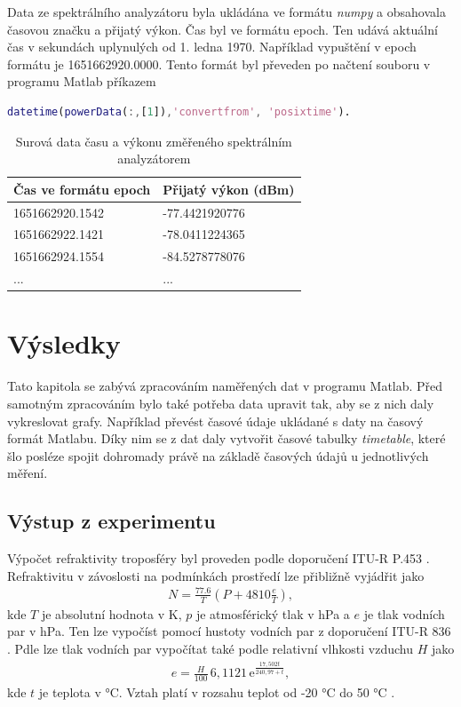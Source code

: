 \documentclass[twoside]{ctuthesis}
\newcommand{\mt}[1]{\text{#1}}
\theoremstyle{plain}
\theoremstyle{definition}
\theoremstyle{note}
\begin{document}
	Data ze spektrálního analyzátoru byla ukládána ve formátu \textit{numpy} a obsahovala časovou značku a přijatý výkon. Čas byl ve formátu epoch. Ten udává aktuální čas v sekundách uplynulých od 1. ledna 1970. Například vypuštění v epoch formátu je 1651662920.0000. Tento formát byl převeden po načtení souboru v programu Matlab příkazem
	\begin{lstlisting}[language=Matlab]
		datetime(powerData(:,[1]),'convertfrom', 'posixtime').\end{lstlisting}
	\begin{table}
		\centering
		\begin{tabular}{l|l}
			Čas ve formátu epoch &	Přijatý výkon (dBm)\\\hline
			1651662920.1542&       -77.4421920776\\
			1651662922.1421 &      -78.0411224365\\
			1651662924.1554  &     -84.5278778076\\
			...&...
		\end{tabular}
		\caption{Surová data času a výkonu změřeného spektrálním analyzátorem}
	\end{table}





\chapter{Výsledky}
	Tato kapitola se zabývá zpracováním naměřených dat v programu Matlab. Před samotným zpracováním bylo také potřeba data upravit tak, aby se z nich daly vykreslovat grafy. Například převést časové údaje ukládané s daty na časový formát Matlabu. Díky nim se z dat daly vytvořit časové tabulky \textit{timetable}, které šlo posléze spojit dohromady právě na základě časových údajů u jednotlivých měření. 

	\section{Výstup z experimentu}


	Výpočet refraktivity troposféry byl proveden podle doporučení ITU-R P.453 \cite{ITU:refrac}. Refraktivitu v závoslosti na podmínkách prostředí lze přibližně vyjádřit jako
	\begin{align}
		N = \frac{77.6}{T} \left(P + 4810\frac{e}{T}\right),
		\label{eq:refr:meas}
	\end{align}
	kde $T$ je absolutní hodnota v K, $p$ je atmosférický tlak v hPa a $e$ je tlak vodních par v hPa. Ten lze vypočíst pomocí hustoty vodních par z doporučení ITU-R 836 \cite{ITU:vapour}. Pdle \cite{ITU:refrac} lze tlak vodních par vypočítat také podle relativní vlhkosti vzduchu $H$ jako
	\begin{align}
		e = \frac{H}{100}\,6{,}1121\,\mt{e}^{\frac{17{,}502t}{240{,}97 + t}},
	\end{align}
	kde $t$ je teplota v °C. Vztah platí v rozsahu teplot od -20 °C do 50 °C \cite{zaklady:sireni:vln}.
\end{document}
